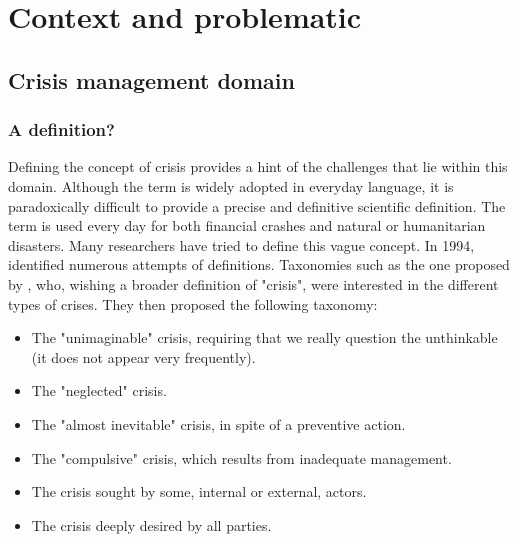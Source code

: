 \chapter{Context and problematic}

\section{Crisis management domain}
\subsection{A definition?}
Defining the concept of crisis provides a hint of the challenges that lie within this domain.
Although the term is widely adopted in everyday language, it is paradoxically difficult to provide a precise and definitive scientific definition.
The term is used every day for both financial crashes and natural or humanitarian disasters.
Many researchers have tried to define this vague concept.
In 1994, \textcite{lagadecGESTIONCRISES1994} identified numerous attempts of definitions.
Taxonomies such as the one proposed by \textcite{rosenthalCrisisDecisionMakingNetherlands1986}, who, wishing a broader definition of "crisis", were interested in the different types of crises.
They then proposed the following taxonomy:

\begin{itemize}
    \item The "unimaginable" crisis, requiring that we really question the unthinkable (it does not appear very frequently).
    \item The "neglected" crisis.
    \item The "almost inevitable" crisis, in spite of a preventive action.
    \item The "compulsive" crisis, which results from inadequate management.
    \item The crisis sought by some, internal or external, actors.
    \item The crisis deeply desired by all parties.
\end{itemize}

